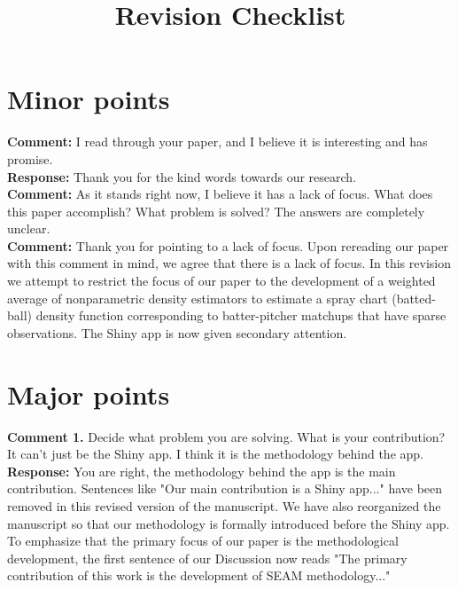\documentclass[12pt]{article}
\title{Revision Checklist}
\author{}
\date{}
\begin{document}
\maketitle

\section*{Minor points}

\noindent\textbf{Comment:} I read through your paper, and I believe it is interesting and has promise. \\

\noindent\textbf{Response:} Thank you for the kind words towards our research. \\

\noindent\textbf{Comment:} As it stands right now, I believe it has a lack of focus. What does this paper accomplish? What problem is solved? The answers are completely unclear. \\

\noindent\textbf{Comment:} Thank you for pointing to a lack of focus. Upon rereading our paper with this comment in mind, we agree that there is a lack of focus. In this revision we attempt to restrict the focus of our paper to the development of a weighted average of nonparametric density estimators to estimate a spray chart (batted-ball) density function corresponding to batter-pitcher matchups that have sparse observations. The Shiny app is now given secondary attention.

\section*{Major points}

\noindent\textbf{Comment 1.} Decide what problem you are solving. What is your contribution? It can’t just be the Shiny app. I think it is the methodology behind the app. \\

\noindent\textbf{Response:} You are right, the methodology behind the app is the main contribution. Sentences like "Our main contribution is a Shiny app..." have been removed in this revised version of the manuscript. We have also reorganized the manuscript so that our methodology is formally introduced before the Shiny app. To emphasize that the primary focus of our paper is the methodological development, the first sentence of our Discussion now reads "The primary contribution of this work is the development of SEAM methodology..." \\
\end{document}
